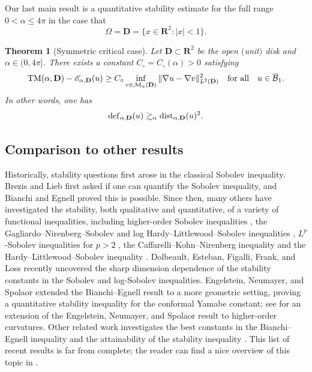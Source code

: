 \documentclass[reqno,11pt]{amsart}
\newtheorem{theorem}{Theorem}
\theoremstyle{definition}
\newcommand{\R}{\mathbf{R}}
\begin{document}
Our last main result is a quantitative stability estimate for the full range 
$0< \alpha \leq 4\pi$ in the case that 
\[
\Omega = \mathbf{D} = \{ x \in \mathbf{R}^2 : |x| < 1 \}.
\]  
\begin{theorem}[Symmetric critical case] \label{thm:critical_stability}
Let $\mathbf{D} \subset \R^2$ be the open $($unit$)$ disk and $\alpha \in (0,4\pi]$.
There exists a constant $C_\circ=C_\circ(\alpha)>0$ satisfying
\begin{equation*} 
{\rm TM}({\alpha},\mathbf{D}) - \mathscr{E}_{\alpha, \mathbf{D}} (u) \geq  C_\circ \inf_{v \in
\mathcal{M}_\alpha(\mathbf{D})} {\|\nabla u - \nabla v \|_{L^2(\mathbf{D})}^2} \quad 
{\rm for \ all} \quad u\in \overline{\mathcal{B}}_1.
\end{equation*} 
In other words, one has
\[
{\rm def}_{\alpha,\mathbf{D}}(u)\gtrsim_{\alpha}{\rm dist}_{\alpha,\mathbf{D}}(u)^2.
\]
\end{theorem} 

\subsection{Comparison to other results} Historically, stability questions first arose in 
the classical Sobolev inequality. Brezis and Lieb \cite{MR790771} first asked if one can
quantify the Sobolev inequality, and Bianchi and Egnell \cite{BE} proved this 
is possible. Since then, many others have investigated the stability, both 
qualitative and quantitative, of a variety of functional inequalities, including 
higher-order Sobolev inequalities \cite{LW,CFW}, the Gagliardo--Nirenberg--Sobolev
and log Hardy--Littlewood--Sobolev inequalities \cite{CarlenFigalli2013}, $L^p$-Sobolev inequalities for
$p> 2$ \cite{FigalliZhang2022},
the Caffarelli--Kohn--Nirenberg inequality \cite{Wei_Wu, Frank_Peteranderl} and
the Hardy--Littlewood--Sobolev inequality \cite{CLT}. Dolbeault, Esteban, Figalli, Frank, and
Loss \cite{DEFFL2025} recently uncovered the sharp dimension dependence of the 
stability constants in the Sobolev and log-Sobolev inequalities. Engelstein, Neumayer,
and Spolaor \cite{MR4427104} extended the Bianchi--Egnell result to a more geometric
setting, proving a quantitative stability inequality for the conformal
Yamabe constant; see \cite{andrade2024quantitativestabilitytotalqcurvature} for
an extension of the Engelstein, Neumayer, and Spolaor result
to higher-order curvatures. Other related work investigates the best constants in
the Bianchi--Egnell inequality \cite{MR4623703} and the attainability of the stability 
inequality \cite{arxiv:2211.14185}. This list of recent results is far from complete; 
the reader can find a nice overview of this topic in \cite{FrankKonigTang2023}. 
\end{document}
